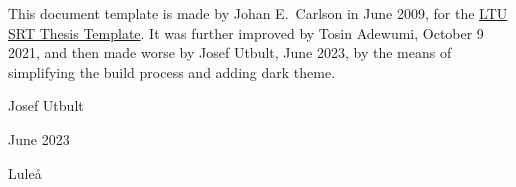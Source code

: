This document template is made by Johan E.\ Carlson in June 2009, for the \href{https://www.overleaf.com/latex/templates/ltu-srt-thesis-template/jnqrnxdqxrvx}{LTU SRT Thesis Template}. 
It was further improved by Tosin Adewumi, October 9 2021, 
and then made worse by Josef Utbult, June 2023, by the means of simplifying the build process and adding dark theme.

Josef Utbult

June 2023

Luleå
